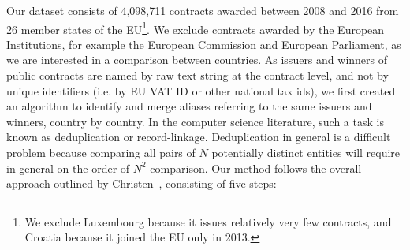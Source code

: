 Our dataset consists of 4,098,711 contracts awarded between 2008 and 2016 from 26 member states of the EU\footnote{We exclude Luxembourg because it issues relatively very few contracts, and Croatia because it joined the EU only in 2013.}. We exclude contracts awarded by the European Institutions, for example the European Commission and European Parliament, as we are interested in a comparison between countries. As issuers and winners of public contracts are named by raw text string at the contract level, and not by unique identifiers (i.e. by EU VAT ID or other national tax ids), we first created an algorithm to identify and merge aliases referring to the same issuers and winners, country by country. In the computer science literature, such a task is known as deduplication or record-linkage. Deduplication in general is a difficult problem because comparing all pairs of $N$ potentially distinct entities will require in general on the order of $N^{2}$ comparison. Our method follows the overall approach outlined by Christen~\cite{christen2012data}, consisting of five steps:

